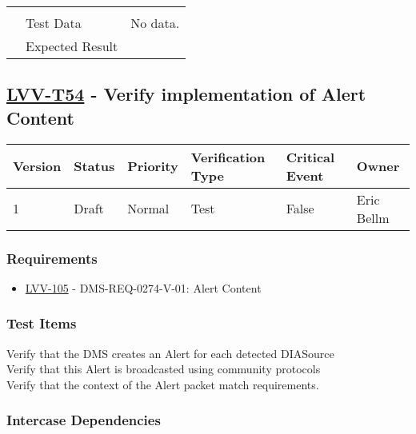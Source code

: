 \begin{longtable}[]{p{1.3cm}p{2cm}p{13cm}}
\begin{minipage}[t]{13cm}
{            \vspace{\dp0}
            } \end{minipage} \\ \cline{2-3}
            & Test Data &
            \begin{minipage}[t]{13cm}{\footnotesize
                No data.
                \vspace{\dp0}
            } \end{minipage} \\ \cline{2-3}
            & Expected Result &
        \\ \midrule
    \end{longtable}

\subsection{\href{https://jira.lsstcorp.org/secure/Tests.jspa\#/testCase/LVV-T54}{LVV-T54}
    - Verify implementation of Alert Content}\label{lvv-t54}

\begin{longtable}[]{llllll}
\toprule
Version & Status & Priority & Verification Type & Critical Event & Owner
\\\midrule
1 & Draft & Normal &
Test & False & Eric Bellm
\\\bottomrule
\end{longtable}

\subsubsection{Requirements}
\begin{itemize}
\item \href{https://jira.lsstcorp.org/browse/LVV-105}{LVV-105} - DMS-REQ-0274-V-01: Alert Content
\end{itemize}

\subsubsection{Test Items}
Verify that the DMS creates an Alert for each detected DIASource\\
Verify that this Alert is broadcasted using community protocols\\
Verify that the context of the Alert packet match requirements.



\subsubsection{Intercase Dependencies}

